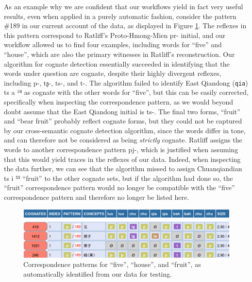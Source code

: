 \documentclass[xetex,svgnames]{scrartcl}
\begin{document}
As an example why we are confident that our workflows yield in fact very useful results, even when
applied in a purely automatic fashion, consider the pattern \#189 in our current account of the
data, as displayed in Figure \ref{fig:fruit}. The reflexes in this pattern correspond to Ratliff's Proto-Hmong-Mien {\sil *pr-} initial, and
our workflow allowed us to find four examples, including words for ``five'' and ``house'', which are
also the primary witnesses in Ratliff's reconstruction. Our algorithm for cognate detection
essentially succeeded in identifying that the words under question are cognate, despite their highly
divergent reflexes, including {\sil p-}, {\sil tʂ-}, {\sil ts-}, and {\sil t-}. The algorithm failed
to identify East Qiandong (\texttt{qia}) {\sil ts a ²⁴} as cognate with the other words for
``five'', but this can be easily corrected, specifically when inspecting the correspondence pattern,
as we would beyond doubt assume that the East Qiandong initial is {\sil ts-}. The final two forms,
``fruit'' and ``bear fruit'' probably reflect cognate forms, but they could not be captured by our
cross-semantic cognate detection algorithm, since the words differ in tone, and can therefore not be
considered as being \emph{strictly} cognate. Ratliff assigns the words to another correspondence
pattern {\sil *pj-}, which is justified when assuming that this would yield traces in the reflexes
of our data. Indeed, when inspecting the data further, we can see that the algorithm missed
to assign Chuanqiandian {\sil ts i ⁵⁵} ``fruit'' to the other cognate sets, but if the algorithm had
done so, the ``fruit'' correspondence pattern would no longer be compatible with the ``five''
correspondence pattern and therefore no longer be listed here.

\begin{figure}[htb]
  \centering
  \includegraphics[width=\textwidth]{five.png}
  \caption{Correspondence patterns for ``five'', ``house'', and ``fruit'', as automatically
  identified from our data for testing.}
  \label{fig:fruit}
\end{figure}
\end{document}
